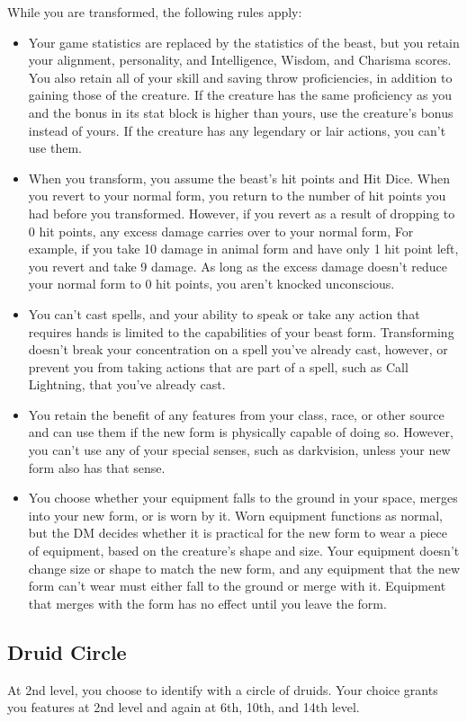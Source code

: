 {While you are transformed, the following rules apply:
\begin{itemize}
	\item Your game statistics are replaced by the statistics of the beast, but you retain your alignment, personality, and Intelligence, Wisdom, and Charisma scores. You also retain all of your skill and saving throw proficiencies, in addition to gaining those of the creature. If the creature has the same proficiency as you and the bonus in its stat block is higher than yours, use the creature's bonus instead of yours. If the creature has any legendary or lair actions, you can't use them.
	\item When you transform, you assume the beast's hit points and Hit Dice. When you revert to your normal form, you return to the number of hit points you had before you transformed. However, if you revert as a result of dropping to 0 hit points, any excess damage carries over to your normal form, For example, if you take 10 damage in animal form and have only 1 hit point left, you revert and take 9 damage. As long as the excess damage doesn't reduce your normal form to 0 hit points, you aren't knocked unconscious.
	\item You can't cast spells, and your ability to speak or take any action that requires hands is limited to the capabilities of your beast form. Transforming doesn't break your concentration on a spell you've already cast, however, or prevent you from taking actions that are part of a spell, such as Call Lightning, that you've already cast.
	\item You retain the benefit of any features from your class, race, or other source and can use them if the new form is physically capable of doing so. However, you can't use any of your special senses, such as darkvision, unless your new form also has that sense.
	\item You choose whether your equipment falls to the ground in your space, merges into your new form, or is worn by it. Worn equipment functions as normal, but the DM decides whether it is practical for the new form to wear a piece of equipment, based on the creature's shape and size. Your equipment doesn't change size or shape to match the new form, and any equipment that the new form can't wear must either fall to the ground or merge with it. Equipment that merges with the form has no effect until you leave the form.
\end{itemize}
\subsection*{Druid Circle}
At 2nd level, you choose to identify with a circle of druids. Your choice grants you features at 2nd level and again at 6th, 10th, and 14th level.
}
